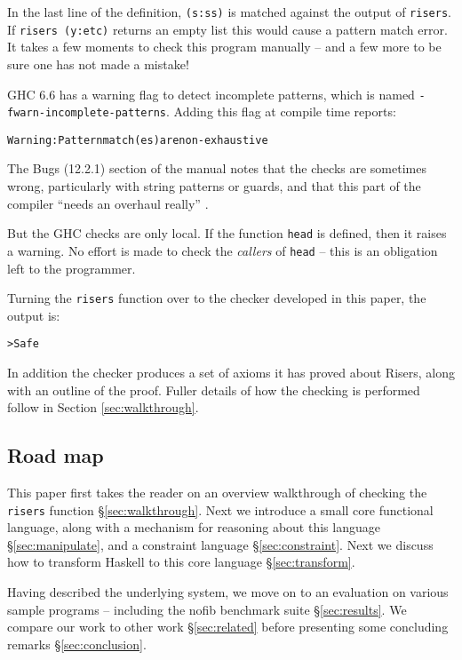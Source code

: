 \documentclass[preprint]{sigplanconf}
\newcommand{\T}[1]{\texttt{#1}}
\newenvironment{code}{\begin{alltt}\small}{\end{alltt}}
\begin{document}
In the last line of the definition, \T{(s:ss)} is matched against the output of \T{risers}. If \T{risers (y:etc)} returns an empty list this would cause a pattern match error. It takes a few moments to check this program manually -- and a few more to be sure one has not made a mistake!

GHC \cite{ghc_manual} 6.6 has a warning flag to detect incomplete patterns, which is named \T{-fwarn-incomplete-patterns}. Adding this flag at compile time reports:

\begin{code}
Warning: Pattern match(es) are non-exhaustive
\end{code}

The Bugs (12.2.1) section of the manual notes that the checks are sometimes wrong, particularly with string patterns or guards, and that this part of the compiler ``needs an overhaul really'' \cite{ghc_manual}.

But the GHC checks are only local. If the function \T{head} is defined, then it raises a warning. No effort is made to check the \textit{callers} of \T{head} -- this is an obligation left to the programmer.

Turning the \T{risers} function over to the checker developed in this paper, the output is:

\begin{code}
> Safe
\end{code}

In addition the checker produces a set of axioms it has proved about Risers, along with an outline of the proof. Fuller details of how the checking is performed follow in Section \ref{sec:walkthrough}.

\subsection{Road map}

This paper first takes the reader on an overview walkthrough of checking the \T{risers} function \S\ref{sec:walkthrough}. Next we introduce a small core functional language, along with a mechanism for reasoning about this language \S\ref{sec:manipulate}, and a constraint language \S\ref{sec:constraint}. Next we discuss how to transform Haskell to this core language \S\ref{sec:transform}.

Having described the underlying system, we move on to an evaluation on various sample programs -- including the \textsf{nofib} benchmark suite \S\ref{sec:results}. We compare our work to other work \S\ref{sec:related} before presenting some concluding remarks \S\ref{sec:conclusion}.
\end{document}
